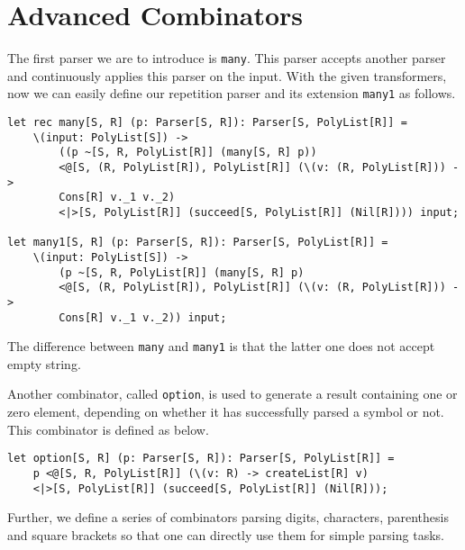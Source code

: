 \section{Advanced Combinators}
The first parser we are to introduce is \texttt{many}. This parser accepts another parser and continuously applies this parser on the input. With the given transformers, now we can easily define our repetition parser and its extension \texttt{many1} as follows.
\begin{lstlisting}
let rec many[S, R] (p: Parser[S, R]): Parser[S, PolyList[R]] =
    \(input: PolyList[S]) ->
        ((p ~[S, R, PolyList[R]] (many[S, R] p)) 
        <@[S, (R, PolyList[R]), PolyList[R]] (\(v: (R, PolyList[R])) -> 
        Cons[R] v._1 v._2)
        <|>[S, PolyList[R]] (succeed[S, PolyList[R]] (Nil[R]))) input;
        
let many1[S, R] (p: Parser[S, R]): Parser[S, PolyList[R]] =
    \(input: PolyList[S]) ->
        (p ~[S, R, PolyList[R]] (many[S, R] p)
        <@[S, (R, PolyList[R]), PolyList[R]] (\(v: (R, PolyList[R])) -> 
        Cons[R] v._1 v._2)) input;
\end{lstlisting}
The difference between \texttt{many} and \texttt{many1} is that the latter one does not accept empty string.

Another combinator, called \texttt{option}, is used to generate a result containing one or zero element, depending on whether it has successfully parsed a symbol or not. This combinator is defined as below.
\begin{lstlisting}
let option[S, R] (p: Parser[S, R]): Parser[S, PolyList[R]] =
    p <@[S, R, PolyList[R]] (\(v: R) -> createList[R] v)
    <|>[S, PolyList[R]] (succeed[S, PolyList[R]] (Nil[R]));
\end{lstlisting}
Further, we define a series of combinators parsing digits, characters, parenthesis and square brackets so that one can directly use them for simple parsing tasks.

